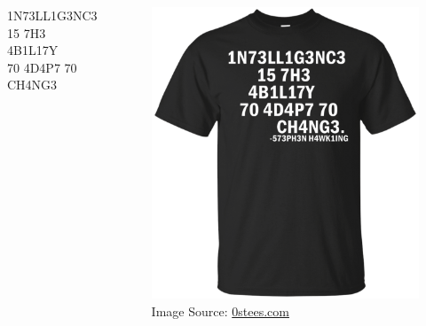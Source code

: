 \begin{frame}[standout]
  \begin{columns}
    \centering
    1N73LL1G3NC3 \\
    15 7H3 \\
    4B1L17Y \\
    70 4D4P7 70 \\
    CH4NG3

    \pause
    \begin{figure}
      \centering
      \includegraphics[height=\textwidth]{figures/shirt.png}
      \caption{\color{white} Image Source: \href{https://www.0stees.com/products/intelligence-is-the-ability-to-adapt-to-change-shirt-hoodie-tank?variant=40350207242}{0stees.com}}
    \end{figure}
  \end{columns}
\end{frame}

